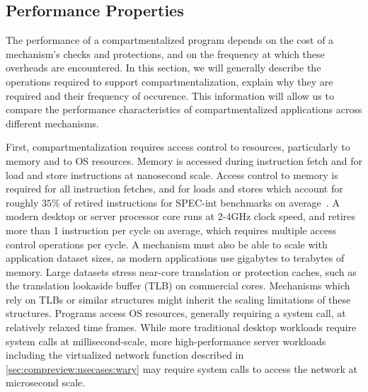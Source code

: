 \subsection{Performance Properties}
The performance of a compartmentalized program depends on the cost of
a mechanism's checks and protections, and on the frequency at which these
overheads are encountered.
In this section, we will generally describe the operations required to
support compartmentalization, explain why they are required and their
frequency of occurence. 
This information will allow us to compare the performance characteristics
of compartmentalized applications across different mechanisms.

First, compartmentalization requires access control to resources, particularly
to memory and to OS resources.
Memory is accessed during instruction fetch and for load and store instructions
at nanosecond scale.
Access control to memory is required for all instruction fetches, and for
loads and stores which account for roughly $35\%$ of retired instructions
for SPEC-int benchmarks on average~\cite{LimayeA18}.
A modern desktop or server processor core runs at 2-4GHz clock speed, and
retires more than 1 instruction per cycle on average, which requires
multiple access control operations per cycle.
A mechanism must also be able to scale with application dataset sizes, as
modern applications use gigabytes to terabytes of memory.
Large datasets stress near-core translation or protection caches, such as
the translation lookaside buffer (TLB) on commercial cores.
Mechanisms which rely on TLBs or similar structures might inherit the
scaling limitations of these structures.
Programs access OS resources, generally requiring a system call, at
relatively relaxed time frames.
While more traditional desktop workloads require system calls at 
millisecond-scale, more high-performance server workloads including the
virtualized network function described in 
\autoref{sec:compreview:usecases:wary} may require system calls to access
the network at microsecond scale.

